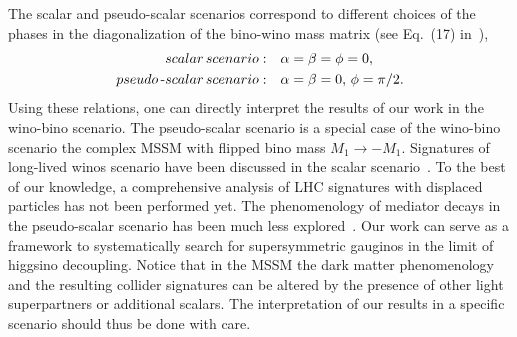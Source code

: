 \documentclass[nofootinbib,prd,aps,superscriptaddress,preprintnumbers]{revtex4}
\begin{document}
The scalar and pseudo-scalar scenarios correspond to different choices of the phases in the diagonalization of the bino-wino mass matrix (see Eq.~(17) in~\cite{Nagata:2015pra}),
\begin{align}\label{eq:SUSY-phases}
scalar\,scenario: & \quad \alpha=\beta=\phi=0,\\\nonumber
pseudo\text{\,-}scalar\,scenario: & \quad \alpha=\beta=0,\,\phi=\pi/2.
\end{align}
Using these relations, one can directly interpret the results of our work in the wino-bino scenario. The pseudo-scalar scenario is a special case of the wino-bino scenario the complex MSSM with flipped bino mass $M_1 \to - M_1$. Signatures of long-lived winos scenario have been discussed in the scalar scenario~\cite{Buckley:2009kv,Rolbiecki:2015gsa,Bramante:2015una}. To the best of our knowledge, a comprehensive analysis of LHC signatures with displaced particles has not been performed yet.  The phenomenology of mediator decays in the pseudo-scalar scenario has been much less explored~\cite{Bharucha:2013epa}. Our work can serve as a framework to systematically search for supersymmetric gauginos in the limit of higgsino decoupling. Notice that in the MSSM the dark matter phenomenology and the resulting collider signatures can be altered by the presence of other light superpartners or additional scalars. The interpretation of our results in a specific scenario should thus be done with care.

\end{document}
